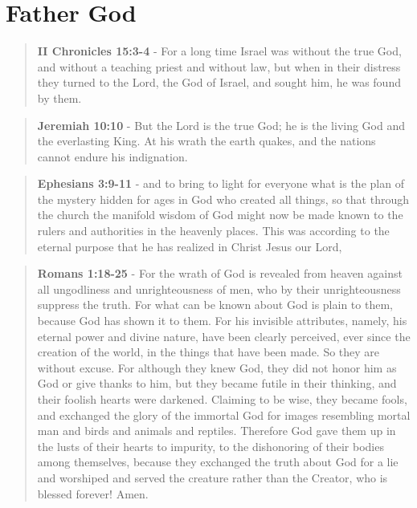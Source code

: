 \documentclass[11pt]{article}
\begin{document}
\section{Father God}
\label{sec:orgd4b8369}
\begin{quote}
\textbf{II Chronicles 15:3-4} - For a long time Israel was without the true God, and without a teaching priest and without law, but when in their distress they turned to the Lord, the God of Israel, and sought him, he was found by them.
\end{quote}

\begin{quote}
\textbf{Jeremiah 10:10} - But the Lord is the true God; he is the living God and the everlasting King. At his wrath the earth quakes, and the nations cannot endure his indignation.
\end{quote}

\begin{quote}
\textbf{Ephesians 3:9-11} - and to bring to light for everyone what is the plan of the mystery hidden for ages in God who created all things, so that through the church the manifold wisdom of God might now be made known to the rulers and authorities in the heavenly places. This was according to the eternal purpose that he has realized in Christ Jesus our Lord,
\end{quote}

\begin{quote}
\textbf{Romans 1:18-25} - For the wrath of God is revealed from heaven against all ungodliness and unrighteousness of men, who by their unrighteousness suppress the truth. For what can be known about God is plain to them, because God has shown it to them. For his invisible attributes, namely, his eternal power and divine nature, have been clearly perceived, ever since the creation of the world, in the things that have been made. So they are without excuse. For although they knew God, they did not honor him as God or give thanks to him, but they became futile in their thinking, and their foolish hearts were darkened. Claiming to be wise, they became fools, and exchanged the glory of the immortal God for images resembling mortal man and birds and animals and reptiles. Therefore God gave them up in the lusts of their hearts to impurity, to the dishonoring of their bodies among themselves, because they exchanged the truth about God for a lie and worshiped and served the creature rather than the Creator, who is blessed forever! Amen.
\end{quote}
\end{document}
